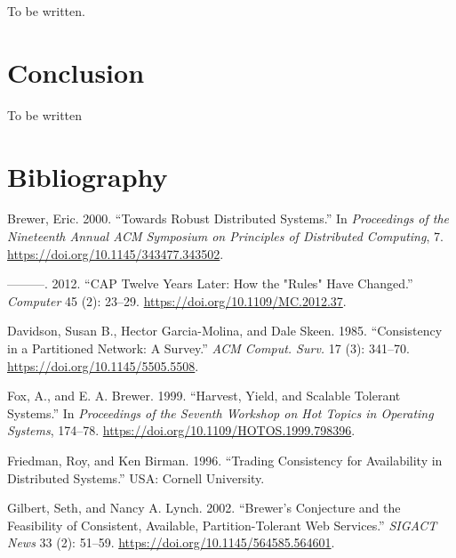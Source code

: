 \documentclass[]             %
{NASA}                       %
\newlength{\cslhangindent}
\newlength{\cslentryspacingunit} %
\newenvironment{CSLReferences}[2] %
 {%
  \setlength{\parindent}{0pt}
  \ifodd #1
  \let\oldpar\par
  \def\par{\hangindent=\cslhangindent\oldpar}
  \fi
  \setlength{\parskip}{#2\cslentryspacingunit}
 }%
 {}
\theoremstyle{definition}
\begin{document}
To be written.

\hypertarget{conclusion}{%
\section{Conclusion}\label{conclusion}}

\label{sec:conclusion}

To be written

\hypertarget{bibliography}{%
\section*{Bibliography}\label{bibliography}}

\hypertarget{refs}{}
\begin{CSLReferences}{1}{0}
\leavevmode{}%
Brewer, Eric. 2000. {``Towards Robust Distributed Systems.''} In
\emph{Proceedings of the Nineteenth Annual ACM Symposium on Principles
of Distributed Computing}, 7.
\url{https://doi.org/10.1145/343477.343502}.

\leavevmode{}%
---------. 2012. {``CAP Twelve Years Later: How the "Rules" Have
Changed.''} \emph{Computer} 45 (2): 23--29.
\url{https://doi.org/10.1109/MC.2012.37}.

\leavevmode{}%
Davidson, Susan B., Hector Garcia-Molina, and Dale Skeen. 1985.
{``Consistency in a Partitioned Network: A Survey.''} \emph{ACM Comput.
Surv.} 17 (3): 341--70. \url{https://doi.org/10.1145/5505.5508}.

\leavevmode{}%
Fox, A., and E. A. Brewer. 1999. {``Harvest, Yield, and Scalable
Tolerant Systems.''} In \emph{Proceedings of the Seventh Workshop on Hot
Topics in Operating Systems}, 174--78.
\url{https://doi.org/10.1109/HOTOS.1999.798396}.

\leavevmode{}%
Friedman, Roy, and Ken Birman. 1996. {``Trading Consistency for
Availability in Distributed Systems.''} USA: Cornell University.

\leavevmode{}%
Gilbert, Seth, and Nancy A. Lynch. 2002. {``Brewer's Conjecture and the
Feasibility of Consistent, Available, Partition-Tolerant Web
Services.''} \emph{SIGACT News} 33 (2): 51--59.
\url{https://doi.org/10.1145/564585.564601}.


\end{CSLReferences}
\end{document}
